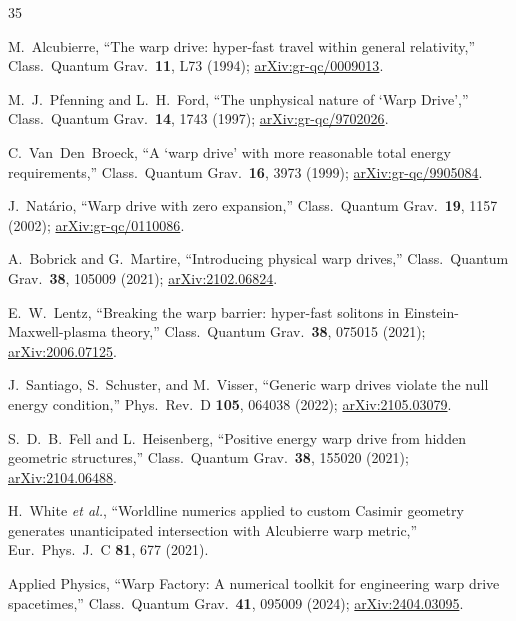 \documentclass[prd,twocolumn,superscriptaddress,longbibliography]{revtex4-2}
\begin{document}
\begin{thebibliography}{35}

M.~Alcubierre,
``The warp drive: hyper-fast travel within general relativity,''
Class.\ Quantum Grav.\ \textbf{11}, L73 (1994);
\href{https://arxiv.org/abs/gr-qc/0009013}{arXiv:gr-qc/0009013}.

M.~J.~Pfenning and L.~H.~Ford,
``The unphysical nature of `Warp Drive',''
Class.\ Quantum Grav.\ \textbf{14}, 1743 (1997);
\href{https://arxiv.org/abs/gr-qc/9702026}{arXiv:gr-qc/9702026}.

C.~Van~Den~Broeck,
``A `warp drive' with more reasonable total energy requirements,''
Class.\ Quantum Grav.\ \textbf{16}, 3973 (1999);
\href{https://arxiv.org/abs/gr-qc/9905084}{arXiv:gr-qc/9905084}.

J.~Nat\'{a}rio,
``Warp drive with zero expansion,''
Class.\ Quantum Grav.\ \textbf{19}, 1157 (2002);
\href{https://arxiv.org/abs/gr-qc/0110086}{arXiv:gr-qc/0110086}.

A.~Bobrick and G.~Martire,
``Introducing physical warp drives,''
Class.\ Quantum Grav.\ \textbf{38}, 105009 (2021);
\href{https://arxiv.org/abs/2102.06824}{arXiv:2102.06824}.

E.~W.~Lentz,
``Breaking the warp barrier: hyper-fast solitons in
Einstein-Maxwell-plasma theory,''
Class.\ Quantum Grav.\ \textbf{38}, 075015 (2021);
\href{https://arxiv.org/abs/2006.07125}{arXiv:2006.07125}.

J.~Santiago, S.~Schuster, and M.~Visser,
``Generic warp drives violate the null energy condition,''
Phys.\ Rev.\ D \textbf{105}, 064038 (2022);
\href{https://arxiv.org/abs/2105.03079}{arXiv:2105.03079}.

S.~D.~B.~Fell and L.~Heisenberg,
``Positive energy warp drive from hidden geometric structures,''
Class.\ Quantum Grav.\ \textbf{38}, 155020 (2021);
\href{https://arxiv.org/abs/2104.06488}{arXiv:2104.06488}.

H.~White \textit{et al.},
``Worldline numerics applied to custom Casimir geometry
generates unanticipated intersection with Alcubierre warp
metric,''
Eur.\ Phys.\ J.\ C \textbf{81}, 677 (2021).

Applied Physics,
``Warp Factory: A numerical toolkit for engineering warp drive
spacetimes,''
Class.\ Quantum Grav.\ \textbf{41}, 095009 (2024);
\href{https://arxiv.org/abs/2404.03095}{arXiv:2404.03095}.


\end{thebibliography}
\end{document}
